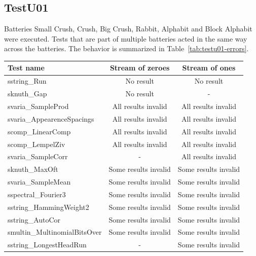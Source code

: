 \documentclass[
  digital,  	%
  color,		%
  oneside,   	%
  12pt,
  nocover,
  notable,
  nolof,
  nolot,
]{fithesis3}
\begin{document}
\subsection*{TestU01}
Batteries Small Crush, Crush, Big Crush, Rabbit, Alphabit and Block Alphabit were executed. Tests that are part of multiple batteries acted in the same way across the batteries. The behavior is summarized in Table~\ref{tab:testu01-errors}.

\begin{table}[h!]
\begin{nomar}
\centering
\begin{tabular}{l || c | c }
\textbf{Test name}                 & \textbf{Stream of zeroes} & \textbf{Stream of ones} \\ \hline \hline    
sstring\_Run                       & No result                & No result                \\
sknuth\_Gap                        & No result                & -                        \\ \hline
svaria\_SampleProd                 & All results invalid      & All results invalid      \\
svaria\_AppearenceSpacings         & All results invalid      & All results invalid      \\   
scomp\_LinearComp                  & All results invalid      & All results invalid      \\
scomp\_LempelZiv                   & All results invalid      & All results invalid      \\
svaria\_SampleCorr                 & -                        & All results invalid      \\ \hline
sknuth\_MaxOft                     & Some results invalid     & Some results invalid     \\
svaria\_SampleMean                 & Some results invalid     & Some results invalid     \\
sspectral\_Fourier3                & Some results invalid     & Some results invalid     \\
sstring\_HammingWeight2            & Some results invalid     & Some results invalid     \\
sstring\_AutoCor                   & Some results invalid     & Some results invalid     \\
smultin\_MultinomialBitsOver       & Some results invalid     & Some results invalid     \\
sstring\_LongestHeadRun            & -                        & Some results invalid     \\ \hline

\end{tabular}
\end{nomar}
\end{table}
\end{document}
